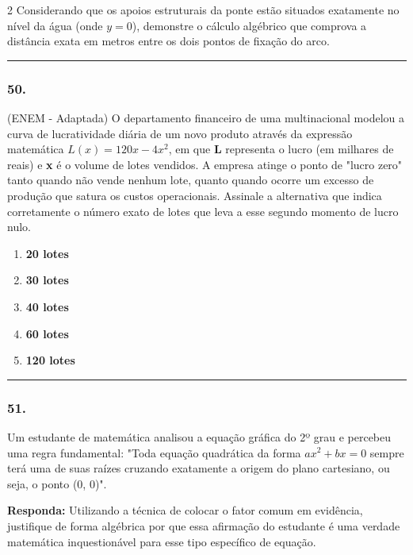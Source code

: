 \documentclass[twoside, 10pt, a4paper]{article}
\newlength{\espacoPreQuestao}\setlength{\espacoPreQuestao}{0.1cm}
\newlength{\espacoQuestao}\setlength{\espacoQuestao}{0.2cm}
\begin{document}
\begin{multicols*}{2}
Considerando que os apoios estruturais da ponte estão situados exatamente no nível da água (onde $ y = 0 $), demonstre o cálculo algébrico que comprova a distância exata em metros entre os dois pontos de fixação do arco.
\par\vspace{\espacoQuestao}

\noindent\textcolor{CorLinha}{\rule{\linewidth}{0.5pt}} 
\par\vspace{\espacoPreQuestao}
\subsubsection*{50.} (ENEM - Adaptada) O departamento financeiro de uma multinacional modelou a curva de lucratividade diária de um novo produto através da expressão matemática $ L(x) = 120x - 4x^2 $, em que \textbf{L} representa o lucro (em milhares de reais) e \textbf{x} é o volume de lotes vendidos. A empresa atinge o ponto de "lucro zero" tanto quando não vende nenhum lote, quanto quando ocorre um excesso de produção que satura os custos operacionais. Assinale a alternativa que indica corretamente o número exato de lotes que leva a esse segundo momento de lucro nulo.
\begin{enumerate}[label=\alph*)]
    \item \textbf{20 lotes}
    \item \textbf{30 lotes}
    \item \textbf{40 lotes}
    \item \textbf{60 lotes}
    \item \textbf{120 lotes}
\end{enumerate}
\par\vspace{\espacoQuestao}

\noindent\textcolor{CorLinha}{\rule{\linewidth}{0.5pt}} 
\par\vspace{\espacoPreQuestao}
\subsubsection*{51.} Um estudante de matemática analisou a equação gráfica do 2º grau e percebeu uma regra fundamental: "Toda equação quadrática da forma $ ax^2 + bx = 0 $ sempre terá uma de suas raízes cruzando exatamente a origem do plano cartesiano, ou seja, o ponto (0, 0)". 
\begin{boxresponda}
\textbf{Responda:} Utilizando a técnica de colocar o fator comum em evidência, justifique de forma algébrica por que essa afirmação do estudante é uma verdade matemática inquestionável para esse tipo específico de equação.
\end{boxresponda}
\par\vspace{\espacoQuestao}


\end{multicols*}
\end{document}
